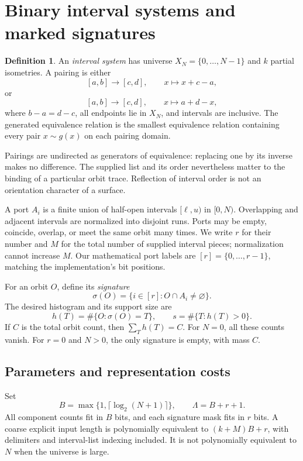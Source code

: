 \documentclass[11pt,letterpaper]{article}
\theoremstyle{definition}
\newtheorem{definition}[theorem]{Definition}
\newcommand{\full}{[r]}
\begin{document}
\section{Binary interval systems and marked signatures}\label{sec:model}

\begin{definition}
An \emph{interval system} has universe
$X_N=\{0,\ldots,N-1\}$ and $k$ partial isometries. A pairing is either
\[
 [a,b]\longrightarrow[c,d],\qquad x\longmapsto x+c-a,
\]
or
\[
 [a,b]\longrightarrow[c,d],\qquad x\longmapsto a+d-x,
\]
where $b-a=d-c$, all endpoints lie in $X_N$, and intervals are inclusive.
The generated equivalence relation is the smallest equivalence relation
containing every pair $x\sim g(x)$ on each pairing domain.
\end{definition}
Pairings are undirected as generators of equivalence: replacing one by its
inverse makes no difference. The supplied list and its order nevertheless
matter to the binding of a particular orbit trace. Reflection of interval
order is not an orientation character of a surface.

A port $A_i$ is a finite union of half-open intervals $[\ell,u)$ in $[0,N)$.
Overlapping and adjacent intervals are normalized into disjoint runs. Ports
may be empty, coincide, overlap, or meet the same orbit many times. We write
$r$ for their number and $M$ for the total number of supplied interval pieces;
normalization cannot increase $M$. Our mathematical port labels are
$\full=\{0,\ldots,r-1\}$, matching the implementation's bit positions.

For an orbit $O$, define its \emph{signature}
\[
 \sigma(O)=\{i\in\full:O\cap A_i\ne\varnothing\}.
\]
The desired histogram and its support size are
\[
 h(T)=\#\{O:\sigma(O)=T\},\qquad
 s=\#\{T:h(T)>0\}.
\]
If $C$ is the total orbit count, then $\sum_T h(T)=C$. For $N=0$, all these
counts vanish. For $r=0$ and $N>0$, the only signature is empty, with mass $C$.

\subsection{Parameters and representation costs}
Set
\[
 B=\max\{1,\lceil\log_2(N+1)\rceil\},\qquad
 \Lambda=B+r+1.
\]
All component counts fit in $B$ bits, and each signature mask fits in $r$
bits. A coarse explicit input length is polynomially equivalent to
$(k+M)B+r$, with delimiters and interval-list indexing included. It is not
polynomially equivalent to $N$ when the universe is large.
\end{document}
